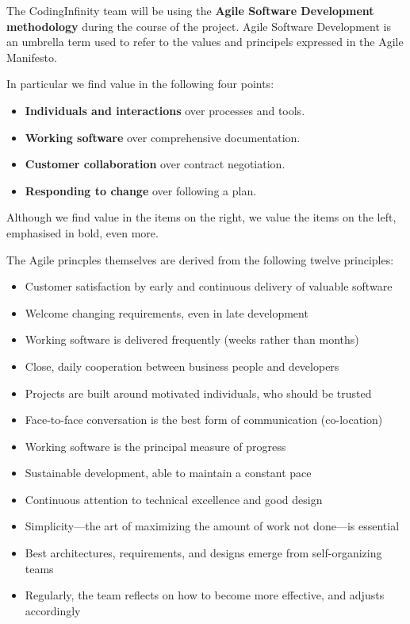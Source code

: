 The CodingInfinity team will be using the \textbf{Agile Software Development methodology} during the course of the project. Agile Software Development is an umbrella term used to refer to the values and principels expressed in the Agile Manifesto.

In particular we find value in the following four points:
\begin{itemize}
	\item \textbf{Individuals and interactions} over processes and tools.
	\item \textbf{Working software} over comprehensive documentation.
	\item \textbf{Customer collaboration} over contract negotiation.
	\item \textbf{Responding to change} over following a plan.
\end{itemize}

Although we find value in the items on the right, we value the items on the left, emphasised in bold, even more.

The Agile princples themselves are derived from the following twelve principles:
\begin{itemize}
  \item Customer satisfaction by early and continuous delivery of valuable software
  \item Welcome changing requirements, even in late development
  \item Working software is delivered frequently (weeks rather than months)
  \item Close, daily cooperation between business people and developers
  \item Projects are built around motivated individuals, who should be trusted
  \item Face-to-face conversation is the best form of communication (co-location)
  \item Working software is the principal measure of progress
  \item Sustainable development, able to maintain a constant pace
  \item Continuous attention to technical excellence and good design
  \item Simplicity—the art of maximizing the amount of work not done—is essential
  \item Best architectures, requirements, and designs emerge from self-organizing teams
  \item Regularly, the team reflects on how to become more effective, and adjusts accordingly
\end{itemize}

